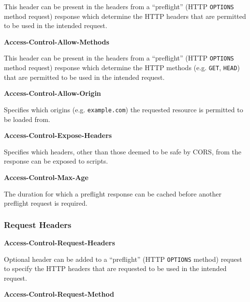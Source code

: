 \documentclass{mscreport}
\begin{document}
\vspace{0.3cm} \noindent
This header can be present in the headers from a ``preflight'' (HTTP \texttt{OPTIONS} method request) response which determine the HTTP headers that are permitted to be used in the intended request.

\vspace{0.7cm} \noindent
\textbf{Access-Control-Allow-Methods}

\vspace{0.3cm} \noindent
This header can be present in the headers from a ``preflight'' (HTTP \texttt{OPTIONS} method request) response which determine the HTTP methods (e.g. \texttt{GET}, \texttt{HEAD}) that are permitted to be used in the intended request.

\vspace{0.7cm} \noindent
\textbf{Access-Control-Allow-Origin}

\vspace{0.3cm} \noindent
Specifies which origins (e.g. \texttt{example.com}) the requested resource is permitted to be loaded from.

\vspace{0.7cm} \noindent
\textbf{Access-Control-Expose-Headers}

\vspace{0.3cm} \noindent
Specifies which headers, other than those deemed to be safe by CORS, from the response can be exposed to scripts.

\vspace{0.7cm} \noindent
\textbf{Access-Control-Max-Age}

\vspace{0.3cm} \noindent
The duration for which a preflight response can be cached before another preflight request is required.

\subsubsection{Request Headers}
\vspace{0.7cm} \noindent
\textbf{Access-Control-Request-Headers}

\vspace{0.3cm} \noindent
Optional header can be added to a ``preflight'' (HTTP \texttt{OPTIONS} method) request to specify the HTTP headers that are requested to be used in the intended request.

\vspace{0.7cm} \noindent
\textbf{Access-Control-Request-Method}
\end{document}
